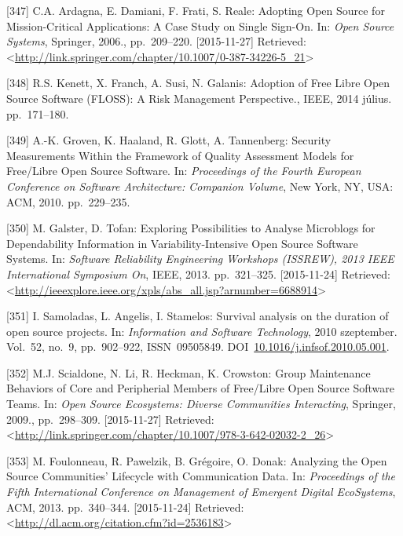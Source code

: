 \documentclass[12pt,magyar,a4paper,oneside]{scrreprt}
\begin{document}
\leavevmode\hypertarget{ref-ardagna_adopting_2006}{}%
{[}347{]} C.A. Ardagna, E. Damiani, F. Frati, S. Reale: Adopting Open
Source for Mission-Critical Applications: A Case Study on Single
Sign-On. In: \emph{Open Source Systems}, Springer, 2006., pp.~209--220.
{[}2015-11-27{]} Retrieved:
\textless{}\url{http://link.springer.com/chapter/10.1007/0-387-34226-5_21}\textgreater{}

\leavevmode\hypertarget{ref-kenett_adoption_2014}{}%
{[}348{]} R.S. Kenett, X. Franch, A. Susi, N. Galanis: Adoption of Free
Libre Open Source Software (FLOSS): A Risk Management Perspective.,
IEEE, 2014 július. pp.~171--180.

\leavevmode\hypertarget{ref-groven_security_2010}{}%
{[}349{]} A.-K. Groven, K. Haaland, R. Glott, A. Tannenberg: Security
Measurements Within the Framework of Quality Assessment Models for
Free/Libre Open Source Software. In: \emph{Proceedings of the Fourth
European Conference on Software Architecture: Companion Volume}, New
York, NY, USA: ACM, 2010. pp.~229--235.

\leavevmode\hypertarget{ref-galster_exploring_2013}{}%
{[}350{]} M. Galster, D. Tofan: Exploring Possibilities to Analyse
Microblogs for Dependability Information in Variability-Intensive Open
Source Software Systems. In: \emph{Software Reliability Engineering
Workshops (ISSREW), 2013 IEEE International Symposium On}, IEEE, 2013.
pp.~321--325. {[}2015-11-24{]} Retrieved:
\textless{}\url{http://ieeexplore.ieee.org/xpls/abs_all.jsp?arnumber=6688914}\textgreater{}

\leavevmode\hypertarget{ref-samoladas_survival_2010}{}%
{[}351{]} I. Samoladas, L. Angelis, I. Stamelos: Survival analysis on
the duration of open source projects. In: \emph{Information and Software
Technology}, 2010 szeptember. Vol.~52, no.~9, pp.~902--922,
ISSN~09505849.
DOI~\href{https://doi.org/10.1016/j.infsof.2010.05.001}{10.1016/j.infsof.2010.05.001}.

\leavevmode\hypertarget{ref-scialdone_group_2009}{}%
{[}352{]} M.J. Scialdone, N. Li, R. Heckman, K. Crowston: Group
Maintenance Behaviors of Core and Peripherial Members of Free/Libre Open
Source Software Teams. In: \emph{Open Source Ecosystems: Diverse
Communities Interacting}, Springer, 2009., pp.~298--309.
{[}2015-11-27{]} Retrieved:
\textless{}\url{http://link.springer.com/chapter/10.1007/978-3-642-02032-2_26}\textgreater{}

\leavevmode\hypertarget{ref-foulonneau_analyzing_2013}{}%
{[}353{]} M. Foulonneau, R. Pawelzik, B. Grégoire, O. Donak: Analyzing
the Open Source Communities' Lifecycle with Communication Data. In:
\emph{Proceedings of the Fifth International Conference on Management of
Emergent Digital EcoSystems}, ACM, 2013. pp.~340--344. {[}2015-11-24{]}
Retrieved:
\textless{}\url{http://dl.acm.org/citation.cfm?id=2536183}\textgreater{}
\end{document}
